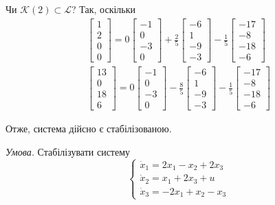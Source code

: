 \documentclass[oneside,solution]{karazin-control-assign}
\begin{document}
Чи $\mathcal{K}(2) \subset \mathcal{L}$? Так, оскільки
\begin{gather}
    \begin{bmatrix}
        1 \\ 2 \\ 0 \\ 0
    \end{bmatrix} = 0\begin{bmatrix}
        -1 \\ 0 \\ -3 \\ 0
    \end{bmatrix} + \frac{2}{5}\begin{bmatrix}
        -6 \\ 1 \\ -9 \\ -3
    \end{bmatrix} - \frac{1}{5}\begin{bmatrix}
        -17 \\ -8 \\ -18 \\ -6
    \end{bmatrix} \\
    \begin{bmatrix}
        13 \\ 0 \\ 18 \\ 6
    \end{bmatrix} = 0\begin{bmatrix}
        -1 \\ 0 \\ -3 \\ 0
    \end{bmatrix} - \frac{8}{5}\begin{bmatrix}
        -6 \\ 1 \\ -9 \\ -3
    \end{bmatrix} - \frac{1}{5}\begin{bmatrix}
        -17 \\ -8 \\ -18 \\ -6
    \end{bmatrix}
\end{gather}

Отже, система дійсно є стабілізованою.


\hspace{20px}\textit{Умова.} Стабілізувати систему
\begin{equation}
    \begin{cases}
        \dot{x}_1 = 2x_1 - x_2 + 2x_3 \\
        \dot{x}_2 = x_1 + 2x_3 + u \\
        \dot{x}_3 = -2x_1 + x_2 - x_3
    \end{cases}
\end{equation}
\end{document}
